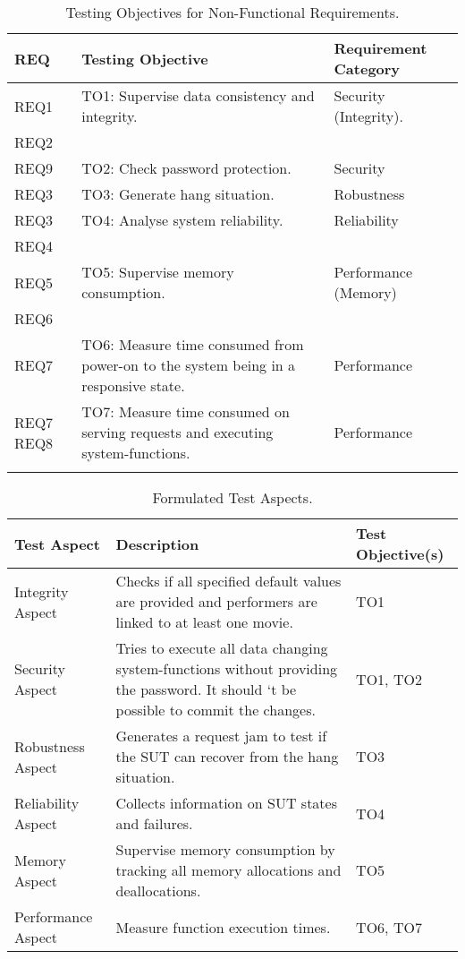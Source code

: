 \begin{table}
\begin{small}
\caption{Testing Objectives for Non-Functional Requirements.}
\begin{tabular}{p{1cm}|p{8cm}|p{4cm}}
\hline
\textbf{REQ} & \textbf{Testing Objective} & \textbf{Requirement Category}\\
\hline
REQ1 & TO1: Supervise data consistency and integrity. & Security (Integrity).\\
REQ2 & \quad & \quad \\
\hline
REQ9 & TO2: Check password protection. & Security\\
\hline 
REQ3 & TO3: Generate hang situation. & Robustness\\
\hline 
REQ3 & TO4: Analyse system reliability. & Reliability\\
REQ4 & \quad & \quad \\
\hline 
REQ5 &TO5: Supervise memory consumption. & Performance (Memory)\\
REQ6 & \quad & \quad \\
\hline
REQ7 & TO6: Measure time consumed from power-on to the system being in a responsive state. & Performance\\
\hline 
REQ7 \quad REQ8 &TO7: Measure time consumed on serving requests and executing system-functions. & Performance\\
\quad & \quad & \quad \\
\hline
\end{tabular}
\label{obj}
\end{small}
\end{table}

\begin{table}
\begin{small}
\caption{Formulated Test Aspects.}
\begin{tabular}{p{3cm}|p{8cm}|p{2cm}}
\hline
\textbf{Test Aspect} & \textbf{Description} & \textbf{Test Objective(s)}\\
\hline
Integrity Aspect & Checks if all specified default values are provided and performers are linked to at least one movie. & TO1\\
\hline
Security Aspect & Tries to execute all data changing system-functions without providing the password. It should ‘t be possible to commit the changes. & TO1, TO2\\
\hline
Robustness Aspect & Generates a request jam to test if the SUT can recover from the hang situation. & TO3\\
\hline
Reliability Aspect & Collects information on SUT states and failures. & TO4\\
\hline
Memory Aspect & Supervise memory consumption by tracking all memory allocations and deallocations. & TO5\\
\hline
Performance Aspect & Measure function execution times. & TO6, TO7\\
\hline
\end{tabular}
\label{aspects}
\end{small}
\end{table}

